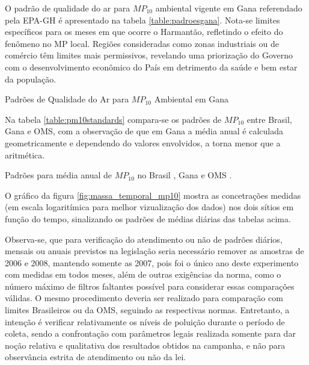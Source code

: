 O padrão de qualidade do ar para $MP_{10}$ ambiental vigente em Gana referendado
pela EPA-GH \citeyearpar{epa2015} é apresentado na tabela 
\ref{table:padroesgana}. Nota-se limites específicos para os meses em que 
ocorre o Harmantão, refletindo o efeito do fenômeno no MP local. 
Regiões consideradas como zonas industriais ou de comércio têm limites mais
permissivos, revelando uma priorização do Governo com o desenvolvimento 
econômico do País em detrimento da saúde e bem estar da população.

\begin{table}[H]
\centering
  
\caption{Padrões de Qualidade do Ar para $MP_{10}$ Ambiental em Gana
         \cite{epa2015} \label{table:padroesgana}}
\end{table}

Na tabela \ref{table:pm10standards} compara-se os padrões de $MP_{10}$ entre 
Brasil, Gana e OMS, com a observação de que em Gana a média anual é calculada 
geometricamente e dependendo do valores envolvidos, a torna menor que a 
aritmética. 

\begin{table}[H]
\centering
  
  \caption{Padrões para média anual de $MP_{10}$ no Brasil \citep{conama1990}, 
           Gana \citep{epa2015} e OMS \citep{who}. \label{table:pm10standards}}
\end{table}

O gráfico da figura \ref{fig:massa_temporal_mp10} mostra as concetrações medidas
(em escala logaritímica para melhor vizualização dos dados) 
nos dois sítios em função do tempo, sinalizando os padrões de médias 
diárias das tabelas acima. 

Observa-se, que para verificação do atendimento ou não de padrões diários, 
mensais ou anuais previstos na legislação seria necessário remover as amostras 
de 2006 e 2008, mantendo somente as 2007, pois foi o único ano deste experimento
com medidas em todos meses, além de outras exigências da norma, como o 
número máximo de filtros faltantes possível para considerar essas comparações
válidas. O mesmo procedimento deveria ser realizado para comparação com 
limites Brasileiros ou da OMS, seguindo as respectivas normas. 
Entretanto, a intenção é verificar
relativamente os níveis de poluição durante o período de 
coleta, sendo a confrontação com parâmetros legais realizada somente para dar
noção relativa e qualitativa dos resultados obtidos na campanha, 
e não para observância estrita de atendimento ou não da lei.

